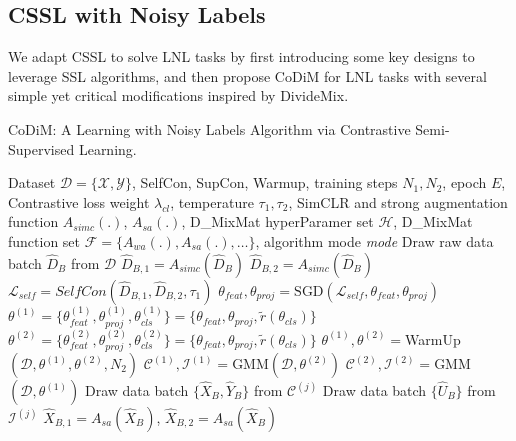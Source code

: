 \documentclass[letterpaper]{article} \usepackage{aaai22}  \usepackage{times}  \usepackage{helvet}  \usepackage{courier}  \usepackage[hyphens]{url}  \usepackage{graphicx} \usepackage{subfigure}
\begin{document}
\subsection{CSSL with Noisy Labels}
We adapt CSSL to solve LNL tasks by first introducing some key designs to leverage SSL algorithms, and then propose CoDiM for LNL tasks with several simple yet critical modifications inspired by DivideMix.
\begin{algorithm}[!h]
\renewcommand{\algorithmicrequire}{\textbf{Input:}}
\renewcommand{\algorithmicensure}{\textbf{Output:}}
\renewcommand{\algorithmiccomment}{ \ \ \ // }
\caption{CoDiM: A Learning with Noisy Labels Algorithm via Contrastive Semi-Supervised Learning. }
\begin{algorithmic}[1]
\REQUIRE Dataset $\mathcal{D}=\{\mathcal{X}, \mathcal{Y}\}$, SelfCon, SupCon, Warmup, training steps $N_1, N_2$, epoch $E$, Contrastive loss weight $\lambda_{cl}$, temperature $\tau_1,\tau_2$, SimCLR and strong augmentation function $A_{simc}(.)$, $A_{sa}(.)$, D\_MixMat hyperParamer set $\mathcal{H}$, D\_MixMat function set $\mathcal{F}=\{A_{wa}(.), A_{sa}(.),\dots\}$, algorithm mode \textit{mode}
 
    \STATE Draw raw data batch $\hat{D}_B$ from $\mathcal{D}$ 
    \STATE $\hat{D}_{B,1}=A_{simc}(\hat{D}_B)$  
    \STATE $\hat{D}_{B,2}=A_{simc}(\hat{D}_B)$  
    \STATE $\mathcal{L}_{self}= SelfCon(\hat{D}_{B,1},\hat{D}_{B,2}, \tau_1)$
    \STATE $\theta_{feat}, \theta_{proj}=\text{SGD}(\mathcal{L}_{self}, \theta_{feat}, \theta_{proj})$
\ENDWHILE
\STATE $\theta^{(1)} = \{\theta_{feat}^{(1)}, \theta_{proj}^{(1)}, \theta_{cls}^{(1)}\} = \{\theta_{feat}, \theta_{proj}, \tilde{r}(\theta_{cls})\}$
\STATE $\theta^{(2)} = \{\theta_{feat}^{(2)}, \theta_{proj}^{(2)}, \theta_{cls}^{(2)}\} = \{\theta_{feat}, \theta_{proj}, \tilde{r}(\theta_{cls})\}$
\STATE $\theta^{(1)}, \theta^{(2)}=$WarmUp$(\mathcal{D}, \theta^{(1)}, \theta^{(2)},N_2)$ 
 
    \STATE $\mathcal{C}^{(1)}, \mathcal{I}^{(1)}=$GMM$(\mathcal{D}, \theta^{(2)})$
    \STATE $\mathcal{C}^{(2)}, \mathcal{I}^{(2)}=$GMM$(\mathcal{D}, \theta^{(1)})$
    \STATE Draw data batch $\{\hat{X}_B, \hat{Y}_B\}$ from $\mathcal{C}^{(j)}$  
    \STATE Draw data batch $\{\hat{U}_B\}$ from $\mathcal{I}^{(j)}$  
    \STATE $\hat{X}_{B,1}=A_{sa}(\hat{X}_B)$, $\hat{X}_{B,2}=A_{sa}(\hat{X}_B)$

\end{algorithmic}
\end{algorithm}
\end{document}

